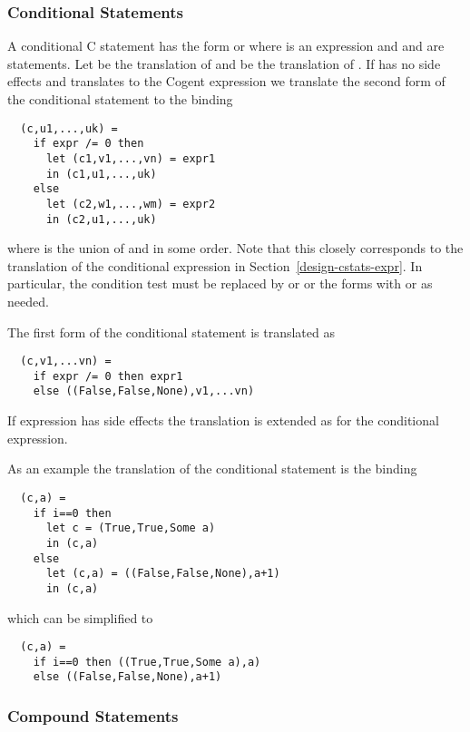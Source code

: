 \subsubsection{Conditional Statements}

A conditional C statement has the form  or  where  is an expression
and  and  are statements. Let  be the translation 
of  and  be the translation of .
If  has no side effects and translates to the Cogent expression  we translate
the second form of the conditional statement to the binding
\begin{verbatim}
  (c,u1,...,uk) =
    if expr /= 0 then 
      let (c1,v1,...,vn) = expr1
      in (c1,u1,...,uk)
    else
      let (c2,w1,...,wm) = expr2
      in (c2,u1,...,uk)
\end{verbatim}
where  is the union of  and  in some order. 
Note that this closely corresponds to the translation 
of the conditional expression in Section~\ref{design-cstats-expr}. In particular, the condition test 
 must be replaced by  or  or 
the forms with  or  as needed.

The first form of the conditional statement is translated as
\begin{verbatim}
  (c,v1,...vn) =
    if expr /= 0 then expr1
    else ((False,False,None),v1,...vn)
\end{verbatim}

If expression  has side effects the translation is extended as for the conditional expression.

As an example the translation of the conditional statement  is the binding
\begin{verbatim}
  (c,a) =
    if i==0 then 
      let c = (True,True,Some a)
      in (c,a)
    else
      let (c,a) = ((False,False,None),a+1)
      in (c,a)
\end{verbatim}
which can be simplified to
\begin{verbatim}
  (c,a) =
    if i==0 then ((True,True,Some a),a)
    else ((False,False,None),a+1)
\end{verbatim}

\subsubsection{Compound Statements}

